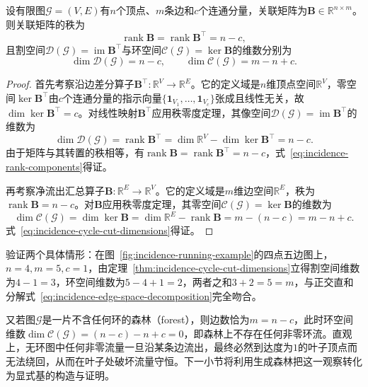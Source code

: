\begin{theorem}[环空间与割空间的维数]
\label{thm:incidence-cycle-cut-dimensions}
设有限图$\mathcal{G}=(V,E)$有$n$个顶点、$m$条边和$c$个连通分量，关联矩阵为$\bm{B}\in\mathbb{R}^{n\times m}$。则关联矩阵的秩为
\begin{equation}
\operatorname{rank}\bm{B}=\operatorname{rank}\bm{B}^\top=n-c,
\label{eq:incidence-rank-components}
\end{equation}
且割空间$\mathcal{D}(\mathcal{G})=\operatorname{im}\bm{B}^\top$与环空间$\mathcal{C}(\mathcal{G})=\ker\bm{B}$的维数分别为
\begin{equation}
\dim\mathcal{D}(\mathcal{G})=n-c,\qquad
\dim\mathcal{C}(\mathcal{G})=m-n+c.
\label{eq:incidence-cycle-cut-dimensions}
\end{equation}
\end{theorem}

\begin{proof}
首先考察沿边差分算子$\bm{B}^\top\colon\mathbb{R}^V\to\mathbb{R}^E$。它的定义域是$n$维顶点空间$\mathbb{R}^V$，零空间$\ker\bm{B}^\top$由$c$个连通分量的指示向量$\{\bm{1}_{V_1},\ldots,\bm{1}_{V_c}\}$张成且线性无关，故$\dim\ker\bm{B}^\top=c$。对线性映射$\bm{B}^\top$应用秩零度定理，其像空间$\mathcal{D}(\mathcal{G})=\operatorname{im}\bm{B}^\top$的维数为
\[
\dim\mathcal{D}(\mathcal{G})=\operatorname{rank}\bm{B}^\top=\dim\mathbb{R}^V-\dim\ker\bm{B}^\top=n-c.
\]
由于矩阵与其转置的秩相等，有$\operatorname{rank}\bm{B}=\operatorname{rank}\bm{B}^\top=n-c$，式~\eqref{eq:incidence-rank-components}得证。

再考察净流出汇总算子$\bm{B}\colon\mathbb{R}^E\to\mathbb{R}^V$。它的定义域是$m$维边空间$\mathbb{R}^E$，秩为$\operatorname{rank}\bm{B}=n-c$。对$\bm{B}$应用秩零度定理，其零空间$\mathcal{C}(\mathcal{G})=\ker\bm{B}$的维数为
\[
\dim\mathcal{C}(\mathcal{G})=\dim\ker\bm{B}=\dim\mathbb{R}^E-\operatorname{rank}\bm{B}=m-(n-c)=m-n+c.
\]
式~\eqref{eq:incidence-cycle-cut-dimensions}得证。
\end{proof}

验证两个具体情形：在图~\ref{fig:incidence-running-example}的四点五边图上，$n=4,m=5,c=1$，由定理~\ref{thm:incidence-cycle-cut-dimensions}立得割空间维数为$4-1=3$，环空间维数为$5-4+1=2$，两者之和$3+2=5=m$，与正交直和分解式~\eqref{eq:incidence-edge-space-decomposition}完全吻合。

又若图$\mathcal{G}$是一片不含任何环的森林（forest），则边数恰为$m=n-c$，此时环空间维数$\dim\mathcal{C}(\mathcal{G})=(n-c)-n+c=0$，即森林上不存在任何非零环流。直观上，无环图中任何非零流量一旦沿某条边流出，最终必然到达度为$1$的叶子顶点而无法绕回，从而在叶子处破坏流量守恒。下一小节将利用生成森林把这一观察转化为显式基的构造与证明。


